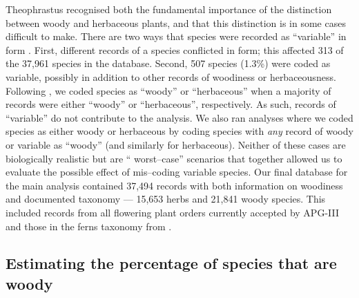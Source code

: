 \documentclass[a4paper,12pt]{article}
\begin{document}
Theophrastus recognised both the fundamental importance of the
distinction between woody and herbaceous plants, and that this
distinction is in some cases difficult to make.  There are two ways
that species were recorded as ``variable'' in form
\citep{beaulieuHiddenRates}.  First, different records of a species
conflicted in form; this affected 313 of the 37,961 species in the
database.
Second, 507 species (1.3\%) were coded as variable, possibly in
addition to other records of woodiness or herbaceousness.
Following \citet{beaulieuHiddenRates}, we coded species as ``woody''
or ``herbaceous'' when a majority of records were either ``woody'' or
``herbaceous'', respectively.  As such, records of ``variable'' do not
contribute to the analysis.
%
We also ran analyses where we coded species as either
woody or herbaceous by coding species with \emph{any} record of woody
or variable as ``woody'' (and similarly for herbaceous). Neither of 
these cases are biologically realistic but are `` worst--case'' scenarios
that together allowed us to evaluate the possible effect of mis--coding 
variable species.
%
Our final database for the main analysis contained 37,494 records with
both information on woodiness and documented taxonomy --- 15,653 herbs
and 21,841 woody species.  This included records from all flowering
plant orders currently accepted by APG-III \citep{APG3} and those in
the ferns taxonomy from \citet{apweb}.


\subsection{Estimating the percentage of species that are woody}
\end{document}
